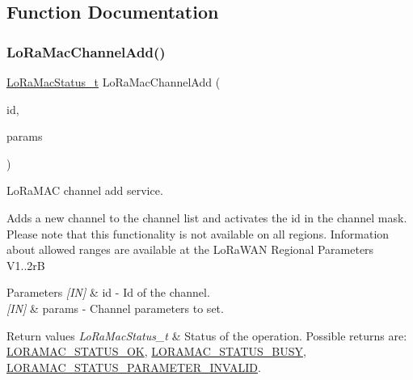 \subsection{Function Documentation}
\mbox{\label{group__LORAMAC_gad74920538f07f34e773ca5de9ec89370}} 
\subsubsection{\texorpdfstring{Lo\+Ra\+Mac\+Channel\+Add()}{LoRaMacChannelAdd()}}
{\footnotesize\ttfamily \hyperlink{group__LORAMAC_ga30bd25657e10480f8605ee951b0ecfbd}{Lo\+Ra\+Mac\+Status\+\_\+t} Lo\+Ra\+Mac\+Channel\+Add (\begin{DoxyParamCaption}\item[{uint8\+\_\+t}]{id,  }\item[{\hyperlink{group__LORAMAC_ga1360ca6f82c6d125ea43a9dad9b56184}{Channel\+Params\+\_\+t}}]{params }\end{DoxyParamCaption})}



Lo\+Ra\+M\+AC channel add service. 

Adds a new channel to the channel list and activates the id in the channel mask. Please note that this functionality is not available on all regions. Information about allowed ranges are available at the Lo\+Ra\+W\+AN Regional Parameters V1..\+2rB


\begin{DoxyParams}{Parameters}
{\em \mbox{[}\+I\+N\mbox{]}} & id -\/ Id of the channel.\\
\hline
{\em \mbox{[}\+I\+N\mbox{]}} & params -\/ Channel parameters to set.\\
\hline
\end{DoxyParams}

\begin{DoxyRetVals}{Return values}
{\em Lo\+Ra\+Mac\+Status\+\_\+t} & Status of the operation. Possible returns are\+: \hyperlink{group__LORAMAC_gga1d18f26b344040b3ec5c3db662919661a03db5fca052313edb3823c014b653a74}{L\+O\+R\+A\+M\+A\+C\+\_\+\+S\+T\+A\+T\+U\+S\+\_\+\+OK}, \hyperlink{group__LORAMAC_gga1d18f26b344040b3ec5c3db662919661a66b12f569207eacd97ee1c1d6c4cee6d}{L\+O\+R\+A\+M\+A\+C\+\_\+\+S\+T\+A\+T\+U\+S\+\_\+\+B\+U\+SY}, \hyperlink{group__LORAMAC_gga1d18f26b344040b3ec5c3db662919661ad0d3119f247d00e1787dda106fcb3017}{L\+O\+R\+A\+M\+A\+C\+\_\+\+S\+T\+A\+T\+U\+S\+\_\+\+P\+A\+R\+A\+M\+E\+T\+E\+R\+\_\+\+I\+N\+V\+A\+L\+ID}. \\
\hline
\end{DoxyRetVals}
\mbox{\label{group__LORAMAC_gafad6c929a33557ac2fd4000bcacd9453}} 
